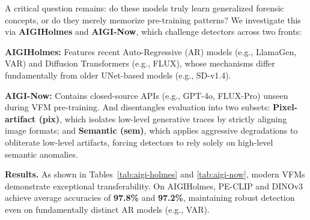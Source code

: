 \documentclass[sigconf,screen]{acmart}
\theoremstyle{plain}
\theoremstyle{definition}
\theoremstyle{remark}
\begin{document}
A critical question remains: do these models truly learn generalized forensic concepts, or do they merely memorize pre-training patterns? We investigate this via \textbf{AIGIHolmes} and \textbf{AIGI-Now}, which challenge detectors across two fronts:

\begin{compactitem}
 \item \textbf{AIGIHolmes:} Features recent Auto-Regressive (AR) models (e.g., LlamaGen, VAR) and Diffusion Transformers (e.g., FLUX), whose mechanisms differ fundamentally from older UNet-based models (e.g., SD-v1.4).
    \item \textbf{AIGI-Now:} Contains closed-source APIs (e.g., GPT-4o, FLUX-Pro) unseen during VFM pre-training. And disentangles evaluation into two subsets: \textbf{Pixel-artifact (pix)}, which isolates low-level generative traces by strictly aligning image formats; and \textbf{Semantic (sem)}, which applies aggressive degradations to obliterate low-level artifacts, forcing detectors to rely solely on high-level semantic anomalies.
\end{compactitem}

\textbf{Results.} As shown in Tables~\ref{tab:aigi-holmes} and \ref{tab:aigi-now}, modern VFMs demonstrate exceptional transferability. On AIGIHolmes, PE-CLIP and DINOv3 achieve average accuracies of \textbf{97.8\%} and \textbf{97.2\%}, maintaining robust detection even on fundamentally distinct AR models (e.g., VAR). 
\end{document}
